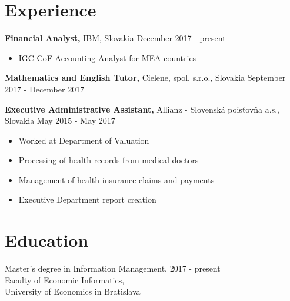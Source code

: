 \documentclass[margin]{res}
\begin{document}

\address{{\bf Permanent Address} \\ Dobrianskeho 1597/49 \\ 093 01 Vranov nad Top\v{l}ou \\ Slovakia \\
        +421 908 274 464 \\ zuzana@kosalko.sk \\ linkedin.com/in/zuzana-kosalkova}

\address{}


\begin{resume}


\section{Experience}

{\bf Financial Analyst,} IBM, Slovakia \hfill December 2017 - present
\begin{itemize} \itemsep -2pt %
\item IGC CoF Accounting Analyst for MEA countries
\end{itemize}

{\bf Mathematics and English Tutor,} Cielene, spol. s.r.o., Slovakia \hfill September 2017 - December 2017

{\bf Executive Administrative Assistant,} Allianz - Slovensk\'{a} pois\v{t}ov\v{n}a a.s., Slovakia \hfill May 2015 - May 2017
\begin{itemize} \itemsep -2pt %
\item Worked at Department of Valuation
\item Processing of health records from medical doctors
\item Management of health insurance claims and payments
\item Executive Department report creation
\end{itemize}

\section{Education}
Master's degree in Information Management, \hfill 2017 - present \\
Faculty of Economic Informatics, \\
University of Economics in Bratislava


\end{resume}
\end{document}
